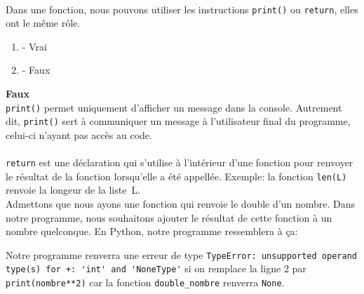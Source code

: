 \begin{Exercice}[2 minutes]\\
Dans une fonction, nous pouvons utiliser les instructions \lstinline{print()} ou \lstinline{return}, elles ont le même rôle.
\begin{enumerate}[label=\Alph*]
    \item - Vrai
    \item - Faux
\end{enumerate}
\begin{solution}
    \textbf{Faux}\\
    \lstinline{print()} permet uniquement d'afficher un message dans la console. Autrement dit, \lstinline{print()} sert à communiquer un message à l'utilisateur final du programme, celui-ci n'ayant pas accès au code.\\\\
    \lstinline{return} est une déclaration qui s'utilise à l'intérieur d'une fonction pour renvoyer le résultat de la fonction lorsqu'elle a été appellée. Exemple: la fonction \lstinline{len(L)} renvoie la longeur de la liste~L.\\

    Admettons que nous ayons une fonction qui renvoie le double d'un nombre. Dans notre programme, nous souhaitons ajouter le résultat de cette fonction à un nombre quelconque.
    En Python, notre programme ressemblera à ça:
    

    Notre programme renverra une erreur de type \lstinline{TypeError: unsupported operand type(s) for +: 'int' and 'NoneType'} si on remplace la ligne 2 par \lstinline{print(nombre**2)} car la fonction \lstinline{double_nombre} renverra \lstinline{None}.
\end{solution}
\end{Exercice}


